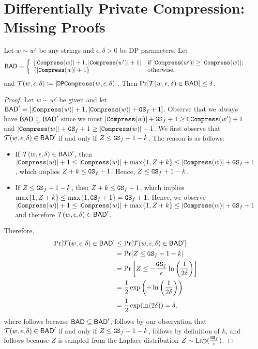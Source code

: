 \allowdisplaybreaks
\section{Differentially Private Compression: Missing Proofs}


\begin{claim}
Let $w\sim w'$ be any strings and $\epsilon,\delta>0$ be DP parameters. Let 
    \[ \mathsf{BAD} = \left\{\begin{array}{ll}
        \left[|\mathtt{Compress}(w)|+1,|\mathtt{Compress}(w')|+1\right] & \text{if } |\mathtt{Compress}(w')| \geq |\mathtt{Compress}(w)|;\\
        \left\{|\mathtt{Compress}(w)|+1\right\} & \text{otherwise,}
    \end{array}\right.\]
    and $\mathcal{T}(w,\epsilon,\delta)\coloneqq|\mathtt{DPCompress}(w,\epsilon,\delta)|$. Then $\Pr[\mathcal{T}(w,\epsilon,\delta)\in \mathsf{BAD}] \leq \delta$.
\end{claim}

\begin{proof} 
Let $w \sim w'$ be given and let $\mathsf{BAD}' = [|\mathtt{Compress}(w)|+1,|\mathtt{Compress}(w)|+\mathtt{GS}_f + 1]$. Observe that we always have $\mathsf{BAD} \subseteq \mathsf{BAD}'$ since we must $|\mathtt{Compress}(w)|+\mathtt{GS}_f +1 \geq \mathtt{LCompress}(w') + 1$ and  $|\mathtt{Compress}(w)|+\mathtt{GS}_f + 1 \geq |\mathtt{Compress}(w)|+1$.   
 We first observe that $\mathcal{T}(w,\epsilon,\delta) \in \mathsf{BAD}'$ if and only if $Z \leq \mathtt{GS}_f+1-k$. The reason is as follows:
 \begin{itemize}
     \item If $\mathcal{T}(w,\epsilon,\delta) \in \mathsf{BAD}'$, then $|\mathtt{Compress}(w)|+1\leq |\mathtt{Compress}(w)|+\max\{1,Z+k\}\leq |\mathtt{Compress}(w)|+\mathtt{GS}_f+1$, which implies $Z+k\leq \mathtt{GS}_f+1$. Hence, $Z\leq \mathtt{GS}_f+1-k$.
     \item If $Z \leq \mathtt{GS}_f+1-k$, then $Z+k\leq \mathtt{GS}_f+1$, which implies $\max\{1,Z+k\}\leq \max\{1,\mathtt{GS}_f+1\} = \mathtt{GS}_f+1$. Hence, we observe $|\mathtt{Compress}(w)|+1\leq |\mathtt{Compress}(w)|+\max\{1,Z+k\}\leq |\mathtt{Compress}(w)|+\mathtt{GS}_f+1$ and therefore $\mathcal{T}(w,\epsilon,\delta) \in \mathsf{BAD}'$.
 \end{itemize}
Therefore, 
\begin{align}
\Pr[\lapalg(w,\epsilon,\delta) \in \BAD] &\leq  \Pr[\lapalg(w,\epsilon,\delta) \in \BAD'] \eqnlab{eq:1} \\
&=  \Pr[Z\leq \GS_f+1-k] \eqnlab{eq:2} \\
&= \Pr\left[Z\leq -\frac{\GS_f}{\epsilon}\ln\left(\frac{1}{2\delta}\right)\right] \eqnlab{eq:3} \\
&=\frac{1}{2}\exp\left(-\ln\left(\frac{1}{2\delta}\right)\right) \eqnlab{eq:4} \\
 &= \frac{1}{2}\exp(\ln(2\delta)) = \delta ,\nonumber 
\end{align}
where  follows because \(\mathsf{BAD} \subseteq \mathsf{BAD}'\),  follows by our observation that $\mathcal{T}(w,\epsilon,\delta) \in \mathsf{BAD}'$ if and only if $Z \leq \mathtt{GS}_f+1-k$,  follows by definition of $k$, and  follows because $Z$ is sampled from the Laplace distribution $Z\sim \mathrm{Lap}(\frac{\mathtt{GS}_f}{\epsilon})$. 
\end{proof}

